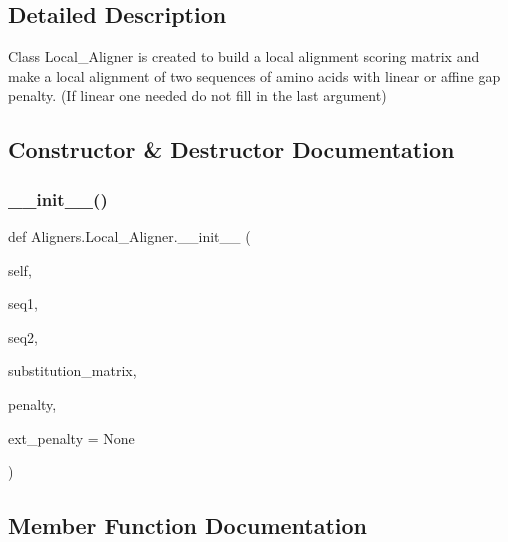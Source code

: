 \subsection{Detailed Description}
\begin{DoxyVerb}Class Local_Aligner is created to build a local alignment scoring matrix
and make a local alignment of two sequences of amino acids
with linear or affine gap penalty.
(If linear one needed do not fill in the last argument)
\end{DoxyVerb}
 

\subsection{Constructor \& Destructor Documentation}
\mbox{\label{class_aligners_1_1_local___aligner_abbe736e7f3e06b702a844384a1fe85b6}} 
\subsubsection{\texorpdfstring{\+\_\+\+\_\+init\+\_\+\+\_\+()}{\_\_init\_\_()}}
{\footnotesize\ttfamily def Aligners.\+Local\+\_\+\+Aligner.\+\_\+\+\_\+init\+\_\+\+\_\+ (\begin{DoxyParamCaption}\item[{}]{self,  }\item[{}]{seq1,  }\item[{}]{seq2,  }\item[{}]{substitution\+\_\+matrix,  }\item[{}]{penalty,  }\item[{}]{ext\+\_\+penalty = {\ttfamily None} }\end{DoxyParamCaption})}



\subsection{Member Function Documentation}
\mbox{\label{class_aligners_1_1_local___aligner_ad7c960fc046613632da34db5857e4c19}} 
